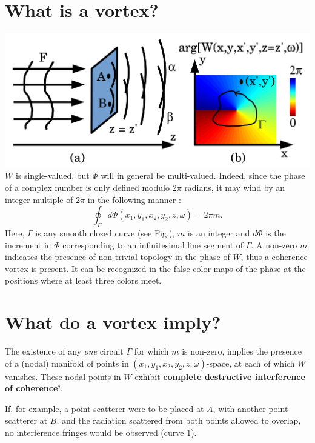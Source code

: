 \documentclass[a4paper,10pt]{article}
\begin{document}
\section{What is a vortex?}


\includegraphics[width=1\textwidth]{Figures/coherence_vortex.png}
 $W$ is single-valued, but $\Phi$ will in general be multi-valued. Indeed, since the phase of a complex number is only defined modulo $2\pi$ radians, it may wind by an integer multiple of $2\pi$ in the following manner \cite{GburVisser2003}: 
\begin{equation}
\label{phase_of_W_winding}
\oint_{\Gamma} d\Phi(x_1,y_1,x_2,y_2,z,\omega)=2\pi m.
\end{equation}
Here, $\Gamma$ is any smooth closed curve (see Fig.), $m$ is an integer and $d\Phi$ is the increment in $\Phi$ corresponding to an infinitesimal line segment of $\Gamma$.
A non-zero $m$ indicates the presence of non-trivial topology in the phase of $W$, thus a coherence vortex \cite{GburVisser2003} is present.  It can be recognized in the false color maps of the phase at the positions where at least three colors meet.

\section{What do a vortex imply?}

The existence of any {\em one} circuit $\Gamma$ for which $m$ is non-zero, implies the presence of a (nodal) manifold of points in $(x_1,y_1,x_2,y_2,z,\omega)$-space, at each of which $W$ vanishes. These nodal points in $W$ exhibit {\bf complete destructive interference of coherence'}. 

If, for example, a point scatterer were to be placed at $A$, with another point scatterer at $B$, and the radiation scattered from both points allowed to overlap, no interference fringes would be observed (curve 1).
\end{document}
